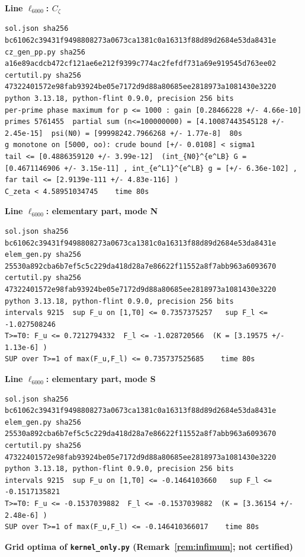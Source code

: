 \documentclass[11pt,reqno]{amsart}
\numberwithin{equation}{section}
\theoremstyle{definition}
\theoremstyle{remark}
\newcommand{\appsub}[1]{\par\medskip\noindent\textbf{#1}\par\nobreak\smallskip}
\begin{document}
\appsub{Line $\ell_{6000}$: $C_\zeta$}
\begin{lstlisting}
sol.json sha256 bc61062c39431f9498808273a0673ca1381c0a16313f88d89d2684e53da8431e
cz_gen_pp.py sha256 a16e89acdcb472cf121ae6e212f9399c774ac2fefdf731a69e919545d763ee02
certutil.py sha256 47322401572e98fab93924be05e7172d9d88a80685ee2818973a1081430e3220
python 3.13.18, python-flint 0.9.0, precision 256 bits
per-prime phase maximum for p <= 1000 : gain [0.28466228 +/- 4.66e-10]
primes 5761455  partial sum (n<=100000000) = [4.10087443545128 +/- 2.45e-15]  psi(N0) = [99998242.7966268 +/- 1.77e-8]  80s
g monotone on [5000, oo): crude bound [+/- 0.0108] < sigma1
tail <= [0.4886359120 +/- 3.99e-12]  (int_{N0}^{e^LB} G = [0.4671146906 +/- 3.15e-11] , int_{e^L1}^{e^LB} g = [+/- 6.36e-102] , far tail <= [2.9139e-111 +/- 4.83e-116] )
C_zeta < 4.58951034745    time 80s
\end{lstlisting}
\appsub{Line $\ell_{6000}$: elementary part, mode N}
\begin{lstlisting}
sol.json sha256 bc61062c39431f9498808273a0673ca1381c0a16313f88d89d2684e53da8431e
elem_gen.py sha256 25530a892cba6b7ef5c5c229da418d28a7e86622f11552a8f7abb963a6093670
certutil.py sha256 47322401572e98fab93924be05e7172d9d88a80685ee2818973a1081430e3220
python 3.13.18, python-flint 0.9.0, precision 256 bits
intervals 9215  sup F_u on [1,T0] <= 0.7357375257   sup F_l <= -1.027508246
T>=T0: F_u <= 0.7212794332  F_l <= -1.028720566  (K = [3.19575 +/- 1.13e-6] )
SUP over T>=1 of max(F_u,F_l) <= 0.735737525685    time 80s
\end{lstlisting}
\appsub{Line $\ell_{6000}$: elementary part, mode S}
\begin{lstlisting}
sol.json sha256 bc61062c39431f9498808273a0673ca1381c0a16313f88d89d2684e53da8431e
elem_gen.py sha256 25530a892cba6b7ef5c5c229da418d28a7e86622f11552a8f7abb963a6093670
certutil.py sha256 47322401572e98fab93924be05e7172d9d88a80685ee2818973a1081430e3220
python 3.13.18, python-flint 0.9.0, precision 256 bits
intervals 9215  sup F_u on [1,T0] <= -0.1464103660   sup F_l <= -0.1517135821
T>=T0: F_u <= -0.1537039882  F_l <= -0.1537039882  (K = [3.36154 +/- 2.48e-6] )
SUP over T>=1 of max(F_u,F_l) <= -0.146410366017    time 80s
\end{lstlisting}
\appsub{Grid optima of \texttt{kernel\_only.py} (Remark~\ref{rem:infimum}; not certified)}\label{app:out_kernel_only}
\end{document}
